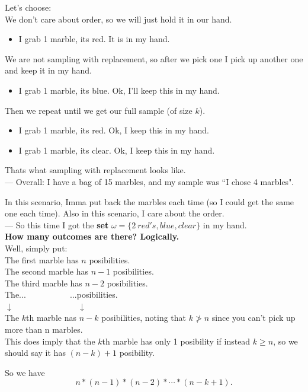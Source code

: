 \documentclass[12pt]{book}
\begin{document}
\noindent Let's choose: \\
We don't care about order, so we will just hold it in our hand.
\begin{itemize}
\item I grab 1 marble, its red. It is in my hand.
\end{itemize}
We are not sampling with replacement, so after we pick one I pick up another one and keep it in my hand.
\begin{itemize}
\item I grab 1 marble, its blue. Ok, I'll keep this in my hand.
\end{itemize}
Then we repeat until we get our full sample (of size $k$). 
\begin{itemize}
\item I grab 1 marble, its red. Ok, I keep this in my hand.
\item I grab 1 marble, its clear. Ok, I keep this in my hand.
\end{itemize}
Thats what sampling with replacement looks like. \\
--- Overall: I have a bag of 15 marbles, and my sample was ``I chose 4 marbles". 

In this scenario, Imma put back the marbles each time (so I could get the same one each time). Also in this scenario, I care about the order. \\
--- So this time I got the \textbf{set} $\omega =\big\{2~red's, blue, clear\big\}$ in my hand.\\

\noindent \textbf{How many outcomes are there? Logically.} \\
Well, simply put:\\
The first marble has $n$ posibilities. \\
The second marble has $n-1$ posibilities.\\
The third marble has $n-2$ posibilities.\\
The...$~~~~~~~~~~~~~~~~~~~~~~~~$...posibilities.\\
$\downarrow ~~~~~~~~~~~~~~~~~~~~~~~~~~~~~~~~~~~\downarrow$\\
The $k$th marble nas $n-k$ posibilities, noting that $k\ngtr n$ since you can't pick up more than n marbles. \\
This does imply that the $k$th marble has only 1 posibility if instead $k\geq n$, so we should say it has $(n-k) + 1$ posibility.

So we have $$n*(n-1)*(n-2)* \cdots *(n-k+1).$$
\end{document}
